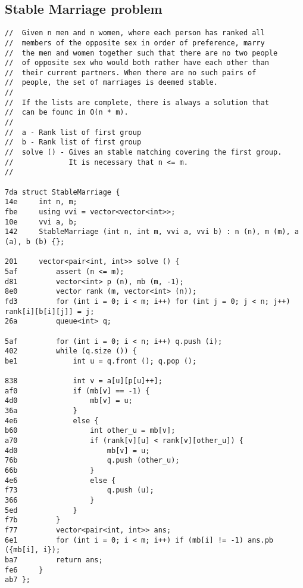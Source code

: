 \documentclass[11pt, a4paper, twoside]{article}
\begin{document}
\subsection{ Stable Marriage problem}
\begin{lstlisting}
//  Given n men and n women, where each person has ranked all 
//  members of the opposite sex in order of preference, marry 
//  the men and women together such that there are no two people 
//  of opposite sex who would both rather have each other than 
//  their current partners. When there are no such pairs of 
//  people, the set of marriages is deemed stable.
//
//  If the lists are complete, there is always a solution that
//  can be founc in O(n * m).
//
//  a - Rank list of first group
//  b - Rank list of first group
//  solve () - Gives an stable matching covering the first group.
//             It is necessary that n <= m.
//

7da struct StableMarriage {
14e     int n, m;
fbe     using vvi = vector<vector<int>>;
10e     vvi a, b;
142     StableMarriage (int n, int m, vvi a, vvi b) : n (n), m (m), a (a), b (b) {};
    
201     vector<pair<int, int>> solve () {
5af         assert (n <= m);
d81         vector<int> p (n), mb (m, -1);
8e0         vector rank (m, vector<int> (n));
fd3         for (int i = 0; i < m; i++) for (int j = 0; j < n; j++) rank[i][b[i][j]] = j;
26a         queue<int> q;
    
5af         for (int i = 0; i < n; i++) q.push (i);
402         while (q.size ()) {
be1             int u = q.front (); q.pop ();
    
838             int v = a[u][p[u]++];
af0             if (mb[v] == -1) {
4d0                 mb[v] = u;
36a             }
4e6             else {
b60                 int other_u = mb[v];
a70                 if (rank[v][u] < rank[v][other_u]) {
4d0                     mb[v] = u;
76b                     q.push (other_u);
66b                 }
4e6                 else {
f73                     q.push (u);
366                 }
5ed             }
f7b         }
f77         vector<pair<int, int>> ans;
6e1         for (int i = 0; i < m; i++) if (mb[i] != -1) ans.pb ({mb[i], i});
ba7         return ans;
fe6     }
ab7 };
\end{lstlisting}
\end{document}
